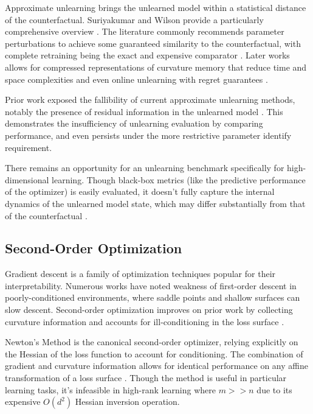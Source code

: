 \documentclass{ssl}
\begin{document}
Approximate unlearning brings the unlearned model within a statistical distance of the counterfactual. Suriyakumar and Wilson provide a particularly comprehensive overview \cite{suriyakumar_algorithms_2022}. The literature commonly recommends parameter perturbations to achieve some guaranteed similarity to the counterfactual, with complete retraining being the exact and expensive comparator \cite{sekhari_remember_2021}. Later works allows for compressed representations of curvature memory that reduce time and space complexities \cite{qiao_hessian-free_2025} and even online unlearning with regret guarantees \cite{hu_online_2025, shen_machine_2025}.

Prior work exposed the fallibility of current approximate unlearning methods, notably the presence of residual information in the unlearned model \cite{liu_threats_2025, chen_when_2021, stewart_shape_2026}. This demonstrates the insufficiency of unlearning evaluation by comparing performance, and even persists under the more restrictive parameter identify requirement. 

There remains an opportunity for an unlearning benchmark specifically for high-dimensional learning. Though black-box metrics (like the predictive performance of the optimizer) is easily evaluated, it doesn't fully capture the internal dynamics of the unlearned model state, which may differ substantially from that of the counterfactual \cite{jeon_information_2024, stewart_shape_2026}.

\subsection{Second-Order Optimization}
Gradient descent is a family of optimization techniques popular for their interpretability. Numerous works have noted weakness of first-order descent in poorly-conditioned environments, where saddle points and shallow surfaces can slow descent. Second-order optimization improves on prior work by collecting curvature information and accounts for ill-conditioning in the loss surface \cite{cesa-bianchi_prediction_2006}.

Newton's Method is the canonical second-order optimizer, relying explicitly on the Hessian of the loss function to account for conditioning. The combination of gradient and curvature information allows for identical performance on any affine transformation of a loss surface \cite{boyd_convex_2023}. Though the method is useful in particular learning tasks, it's infeasible in high-rank learning where $m >> n$ due to its expensive $O(d^2)$ Hessian inversion operation.
\end{document}
